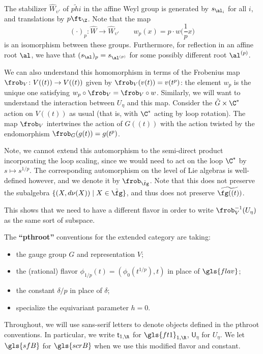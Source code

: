 The
stabilizer $\widehat{W}_{\upsilon'}$ of $\tilde{phi}$ in the affine Weyl
group is generated by $s_{\al_i}$ for all $i$, and 
translations by $p \ft_{\Z}$.  Note that the map \[{(\cdot )}_p\colon \widehat{W}\to \widehat{W}_{\upsilon'} \qquad w_p(x)= p\cdot w\Big(\frac{1}{p}x\Big)\]
is an isomorphism between these groups.  Furthermore, for reflection
in an affine root $\al$, we have that $(s_\al)_p=s_{\al^{(p)}}$ for
some possibly different root $\al^{(p)}$.  

We can also understand this homomorphism in terms of the Frobenius map $\frob_V\colon V((t))\to V((t))$ given by $\frob_V(v(t))=v(t^p)$: the element $w_p$ is the unique one satisfying $w_p\circ \frob_V=\frob_V \circ w$.  Similarly, we will want to understand the interaction between $U_{\eta}$ and this map.  Consider the $\tilde{G}\times \C^*$ action on $V((t))$ as usual (that is, with $\C^*$ acting by loop rotation).  The map $\frob_V$ intertwines the action of 
$G((t))$ with the action twisted by the endomorphism $\frob_G(g(t))=g(t^p)$.

Note, we cannot extend this automorphism to the semi-direct product incorporating the loop scaling, since we would need to act on the loop $\C^*$ by $s\mapsto s^{1/p}$.  The corresponding automorphism on the level of Lie algebras is well-defined however, and we denote it by $\frob_{\tilde{\fg}}$.   Note that this does not preserve the subalgebra $\{(X,d\nu(X))\mid X\in \tilde{\fg}\}$, and thus does not preserve $\widetilde{\fg((t))}$. 

This shows that we need to have a different flavor in order to write $\frob_V^{-1}(U_\eta)$ as the same sort of subspace.  
\begin{definition}\label{def:pth-root}
  The {\bf ``\gls{pthroot}''} conventions for the extended category are taking:
  \begin{itemize}
    \item the gauge group $G$ and representation $V$;
      \item the (rational) flavor $\phi_{1/p}(t)=(\phi_0(t^{1/p}),t)$ in place of $\gls{flav}$;
      \item the constant $\delta/p$ in place of $\delta$;
      \item specialize the equivariant parameter $h=0$.
  \end{itemize}
  Throughout, we will use sans-serif letters to denote objects defined
  in the \gls{pthroot} conventions. In particular, we write
  $\mathsf{t}_{1,\R}$ for  $\gls{ft1}_{1,\R}$,  $\mathsf{U}_\eta$ for
  $U_{\eta}$.  We let $\gls{sfB}$ for $\gls{scrB}$ when we use this
  modified flavor and constant. 
\end{definition}

